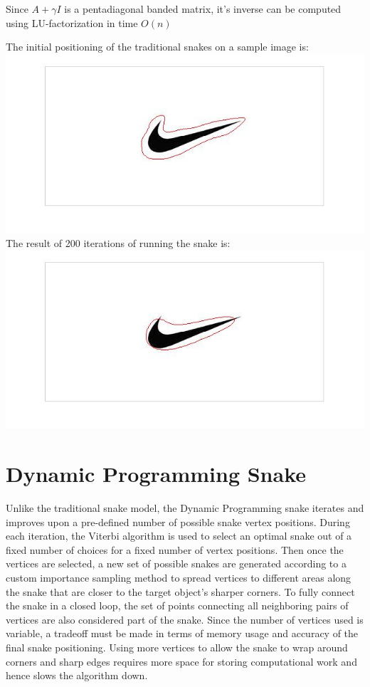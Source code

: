 \documentclass[twoside]{article}
\begin{document}
\begin{multicols}{2}
Since $A + \gamma I$ is a pentadiagonal banded matrix, it's inverse can be computed using LU-factorization in time $O(n)$

The initial positioning of the traditional snakes on a sample image is:
\FloatBarrier
\includegraphics[scale=0.3]{./report_images/snake_preimage.jpg}
\FloatBarrier
The result of 200 iterations of running the snake is:
\FloatBarrier
\includegraphics[scale=0.3]{./report_images/snake_postimage.jpg}
\FloatBarrier



\section{Dynamic Programming Snake}

Unlike the traditional snake model, the Dynamic Programming snake iterates and improves upon a pre-defined number of possible snake vertex positions. During each iteration, the Viterbi algorithm is used to select an optimal snake out of a fixed number of choices for a fixed number of vertex positions. Then once the vertices are selected, a new set of possible snakes are generated according to a custom  importance sampling method to spread vertices to different areas along the snake that are closer to the target object's sharper corners.  To fully connect the snake in a closed loop, the set of points connecting all neighboring pairs of vertices are also considered part of the snake. Since the number of vertices used is variable, a tradeoff must be made in terms of memory usage and accuracy of the final snake positioning. Using more vertices to allow the snake to wrap around corners and sharp edges requires more space for storing computational work and hence slows the algorithm down.
\par  


\end{multicols}
\end{document}
